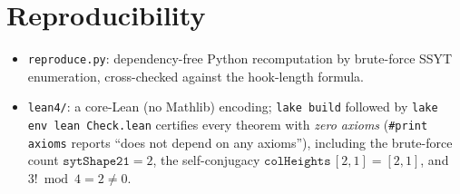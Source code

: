 \documentclass[11pt]{article}
\begin{document}
\section{Reproducibility}

\begin{itemize}
  \item \texttt{reproduce.py}: dependency-free Python recomputation by brute-force SSYT
        enumeration, cross-checked against the hook-length formula.
  \item \texttt{lean4/}: a core-Lean (no Mathlib) encoding; \texttt{lake build} followed by
        \texttt{lake env lean Check.lean} certifies every theorem with
        \emph{zero axioms} (\texttt{\#print axioms} reports ``does not depend on any
        axioms''), including the brute-force count $\texttt{sytShape21} = 2$, the
        self-conjugacy $\texttt{colHeights}\,[2,1] = [2,1]$, and
        $3! \bmod 4 = 2 \ne 0$.
\end{itemize}
\end{document}
